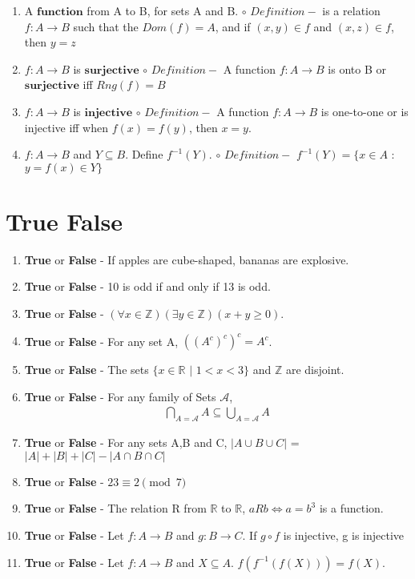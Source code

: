 \documentclass[11pt]{article}
\begin{document}
\begin{enumerate}
    \item A $\mathbf{function}$ from A to B, for sets A and B.
        \newline $\circ$ $Definition - $ is a relation $f:A\rightarrow B$ such that the $Dom(f) = A$, and if $(x,y) \in f$ and $(x,z) \in f$, then $y=z$
    \item $f:A\rightarrow B$ is $\mathbf{surjective}$
        \newline $\circ$ $Definition - $ A function $f:A\rightarrow B$ is onto B or $\mathbf{surjective}$ iff $Rng(f) = B$
    \item $f:A\rightarrow B$ is $\mathbf{injective}$
        \newline $\circ$ $Definition - $ A function $f:A \rightarrow B$ is one-to-one or is injective iff when $f(x)=f(y)$, then $x=y$.
    \item $f:A\rightarrow B$ and $Y \subseteq B$. Define $f^{-1}(Y).$
        \newline $\circ$ $Definition - $ $f^{-1}(Y) = \{x \in A$ : $y=f(x) \in Y\}$
\end{enumerate}
\pagebreak

\section*{True False}
\begin{enumerate}
    \item \textbf{True} or \textbf{False} - If apples are cube-shaped, bananas are explosive.
    \item \textbf{True} or \textbf{False} - 10 is odd if and only if 13 is odd. 
    \item \textbf{True} or \textbf{False} - $(\forall x \in \mathbb{Z})(\exists y \in \mathbb{Z})(x+y\geq 0)$.
    \item \textbf{True} or \textbf{False} - For any set A, $((A^c)^c)^c = A^c$.
    \item \textbf{True} or \textbf{False} - The sets $\{ x \in \mathbb{R}$ $|$ $1 < x < 3 \}$ and $\mathbb{Z}$ are disjoint.
    \item \textbf{True} or \textbf{False} - For any family of Sets $\mathscr{A}$,
    \begin{align*}
        \bigcap_{A = \mathscr{A}} A \subseteq  \bigcup_{A = \mathscr{A}} A
    \end{align*}
    \item \textbf{True} or \textbf{False} - For any sets A,B and C, $|A\cup B \cup C|$ = $|A|+|B|+|C|-|A \cap B \cap C|$
    \item \textbf{True} or \textbf{False} - $23 \equiv 2 \pmod{7}$
    \item \textbf{True} or \textbf{False} - The relation R from $\mathbb{R}$ to $\mathbb{R}$, $aRb \iff a = b^3$ is a function.
    \item \textbf{True} or \textbf{False} - Let $f:A\rightarrow B$ and $g:B \rightarrow C$. If $g\circ f$ is injective, g is injective
    \item \textbf{True} or \textbf{False} - Let $f:A\rightarrow B$ and $X \subseteq A.$ $f(f^{-1}(f(X))) = f(X).$
\end{enumerate}
\pagebreak
\end{document}
